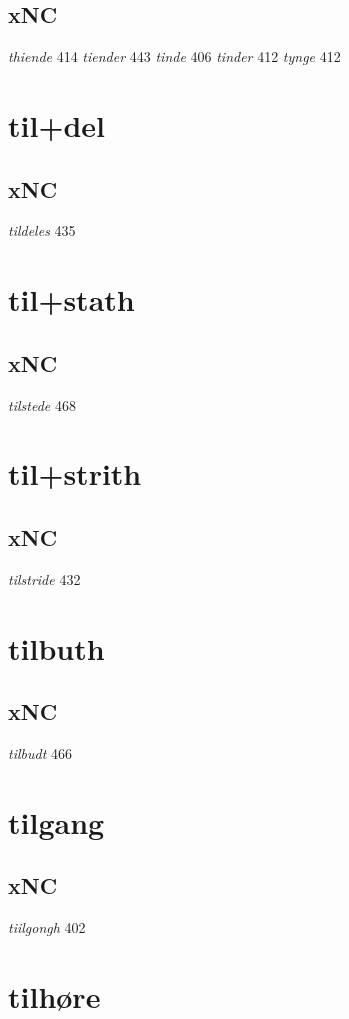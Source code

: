 \documentclass[a4paper,twocolumn]{article}
\begin{document}
\subsection{xNC}
\label{sec:org19dc018}
\emph{thiende} 414 \emph{tiender} 443 \emph{tinde} 406 \emph{tinder} 412 \emph{tynge} 412 
\section{til+del}
\label{sec:org208986e}
\subsection{xNC}
\label{sec:org5e92947}
\emph{tildeles} 435 
\section{til+stath}
\label{sec:orga4acfeb}
\subsection{xNC}
\label{sec:org1959578}
\emph{tilstede} 468 
\section{til+strith}
\label{sec:org1039063}
\subsection{xNC}
\label{sec:orgb549072}
\emph{tilstride} 432 
\section{tilbuth}
\label{sec:org6f43f61}
\subsection{xNC}
\label{sec:org01aba90}
\emph{tilbudt} 466 
\section{tilgang}
\label{sec:orgf4a36b5}
\subsection{xNC}
\label{sec:org840035c}
\emph{tiilgongh} 402 
\section{tilhøre}
\label{sec:org10c3c28}
\end{document}
